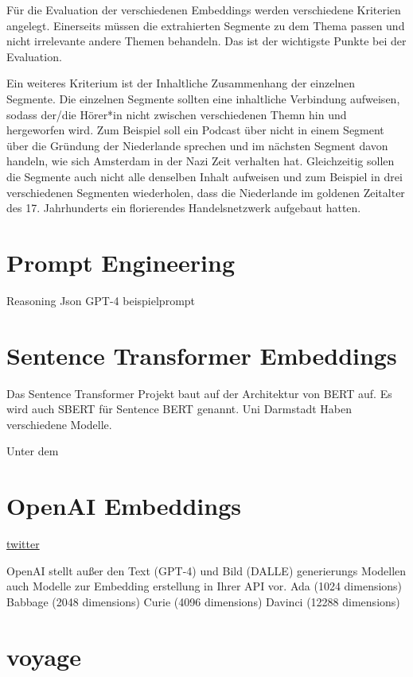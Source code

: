 Für die Evaluation der verschiedenen Embeddings werden verschiedene Kriterien angelegt.
Einerseits müssen die extrahierten Segmente zu dem Thema passen und nicht irrelevante andere Themen behandeln.
Das ist der wichtigste Punkte bei der Evaluation.

Ein weiteres Kriterium ist der Inhaltliche Zusammenhang der einzelnen Segmente.
Die einzelnen Segmente sollten eine inhaltliche Verbindung aufweisen, sodass der/die Hörer*in nicht zwischen verschiedenen Themn hin und hergeworfen wird.
Zum Beispiel soll ein Podcast über  nicht in einem Segment über die Gründung der Niederlande sprechen und im nächsten Segment davon handeln, wie sich Amsterdam in der Nazi Zeit verhalten hat.
Gleichzeitig sollen die Segmente auch nicht alle denselben Inhalt aufweisen und zum Beispiel in drei verschiedenen Segmenten wiederholen, dass die Niederlande im goldenen Zeitalter des 17. Jahrhunderts ein florierendes Handelsnetzwerk aufgebaut hatten.
 


\section{Prompt Engineering}

Reasoning
Json
GPT-4
beispielprompt


 


\section{Sentence Transformer Embeddings}

Das Sentence Transformer Projekt baut auf der Architektur von BERT auf. 
Es wird auch SBERT für Sentence BERT genannt. 
Uni Darmstadt
Haben verschiedene Modelle.

Unter dem 


\section{OpenAI Embeddings}

\href{https://twitter.com/Nils_Reimers/status/1487014195568775173}{twitter}

OpenAI stellt außer den Text (GPT-4) und Bild (DALLE) generierungs Modellen auch Modelle zur Embedding erstellung in Ihrer API vor.
Ada (1024 dimensions)
Babbage (2048 dimensions)
Curie (4096 dimensions)
Davinci (12288 dimensions)

\section{voyage}

